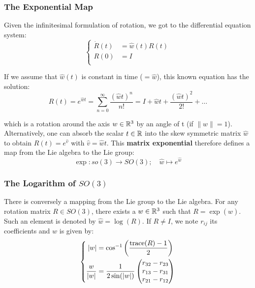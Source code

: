 \subsubsection{The Exponential Map}%
\label{ssub:the_exponential_map}

Given the infinitesimal formulation of rotation,
we got to the differential equation system:
	\[\left\{ \begin{aligned}
		\dot{R}(t) &= \widehat{w}(t)R(t) \\
		R(0) &= I \\
	\end{aligned}\right.\]

If we assume that $\widehat{w}(t)$ is constant in time ($=\widehat{w}$),
this known equation has the solution:
	\[R(t) = e^{\widehat{w}t}
		= \sum_{n=0}^{\infty} \frac{{(\widehat{w}t)}^n }{n!}
		= I + \widehat{w}t + \frac{{(\widehat{w}t)}^2 }{2!} + \ldots \]

which is a rotation around the axis $w \in \mathbb{R}^3$
by an angle of t (if $\|w\| = 1$). Alternatively, one can absorb
the scalar $t \in \mathbb{R}$ into the skew  symmetric matrix $\widehat{w}$
to obtain $R(t) = e^{\widehat{v}}$ with $\widehat{v} = \widehat{w}t$.
This \textbf{matrix exponential} therefore defines a map from
the Lie algebra to the Lie group:
	\[\exp : so(3) \rightarrow SO(3);\quad \widehat{w}\mapsto e^{\widehat{w}}\]


\subsubsection{The Logarithm of $SO(3)$}%
\label{ssub:the_logarithm_of_so_3_}

There is conversely a mapping from the Lie group to the Lie algebra.
For any rotation matrix $R \in SO(3)$, there exists a $w \in \mathbb{R}^3$
such that $R = \exp(\widehat{w})$. Such an element is denoted by
$\widehat{w} = \log(R)$. If $R \ne I$, we note $r_{ij}$ its coefficients
and $w$ is given by:
	\[\left\{ \begin{aligned}
		|w| &= \cos^{-1}\left(\frac{\text{trace}(R)-1}{2}\right)\\
		\frac{w}{|w|} &= \frac{1}{2\sin(|w|)}
			\begin{pmatrix}
				r_{32} - r_{23} \\
				r_{13} - r_{31} \\
				r_{21} - r_{12} \\
			\end{pmatrix}
	\end{aligned}\right.\]

